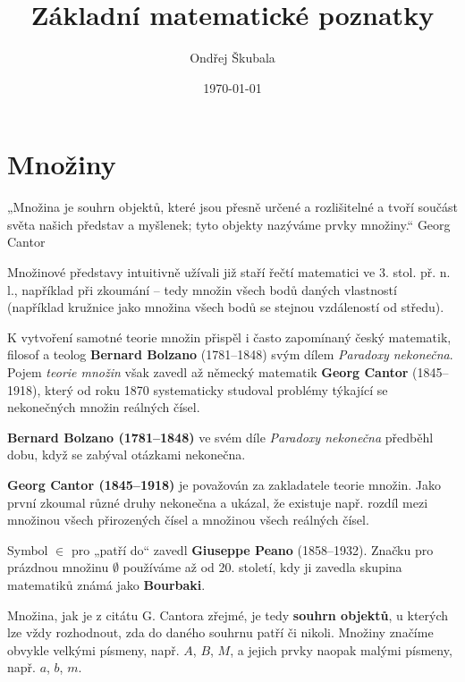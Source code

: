 \documentclass[12pt,a4paper]{article}
\title{Základní matematické poznatky}
\author{Ondřej Škubala}
\date{\today}
\begin{document}
\maketitle
\newpage

\section{Množiny}
\begin{quotebox}
{„Množina je souhrn objektů, které jsou přesně určené a rozlišitelné
 a tvoří součást světa našich představ a myšlenek; tyto objekty nazýváme prvky množiny.“}
{Georg Cantor}
\end{quotebox}

\begin{historicalbox}
Množinové představy intuitivně užívali již staří řečtí matematici
ve 3. stol. př. n. l., například při zkoumání
 – tedy množin všech 
bodů daných vlastností (například kružnice jako množina 
všech bodů se stejnou vzdáleností od středu).  

\smallskip
K vytvoření samotné teorie množin přispěl i často zapomínaný český matematik, 
filosof a teolog \textbf{Bernard Bolzano} (1781–1848) 
svým dílem \emph{Paradoxy nekonečna}. Pojem \emph{teorie množin} 
však zavedl až německý matematik \textbf{Georg Cantor} (1845–1918), 
který od roku 1870 systematicky studoval problémy 
týkající se nekonečných množin reálných čísel.  

\smallskip
\textbf{Bernard Bolzano (1781–1848)} ve svém díle \emph{Paradoxy nekonečna} 
předběhl dobu, když se zabýval otázkami nekonečna.  

\smallskip
\textbf{Georg Cantor (1845–1918)} je považován za zakladatele teorie množin. 
Jako první zkoumal různé druhy nekonečna a ukázal, že existuje např. 
rozdíl mezi množinou všech přirozených čísel a množinou všech reálných čísel.

\smallskip
Symbol $\in$ pro „patří do“ zavedl \textbf{Giuseppe Peano} (1858–1932). 
Značku pro prázdnou množinu $\emptyset$ používáme až od 20. století, 
kdy ji zavedla skupina matematiků známá jako \textbf{Bourbaki}.
\end{historicalbox}


Množina, jak je z citátu G. Cantora zřejmé, je tedy \textbf{souhrn objektů}, 
u kterých lze vždy rozhodnout, zda do daného souhrnu patří či nikoli. 
Množiny značíme obvykle velkými písmeny, např. $A$, $B$, $M$, 
a jejich prvky naopak malými písmeny, např. $a$, $b$, $m$.
\end{document}
